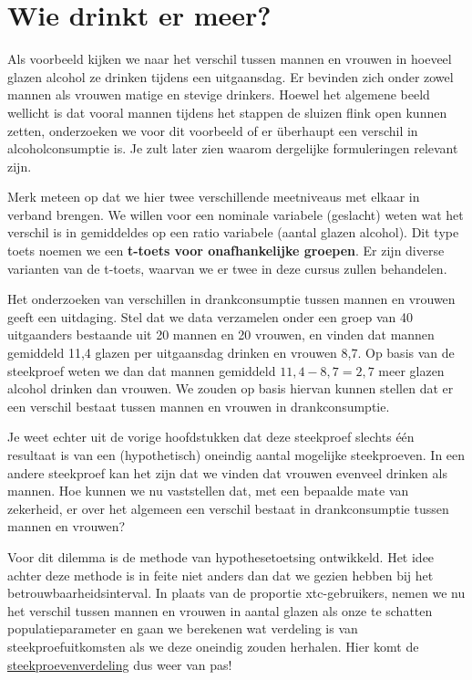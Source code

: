 \documentclass[
  letterpaper,
  DIV=11,
  numbers=noendperiod]{scrreprt}
\begin{document}
\section{Wie drinkt er meer?}\label{wie-drinkt-er-meer}

Als voorbeeld kijken we naar het verschil tussen mannen en vrouwen in
hoeveel glazen alcohol ze drinken tijdens een uitgaansdag. Er bevinden
zich onder zowel mannen als vrouwen matige en stevige drinkers. Hoewel
het algemene beeld wellicht is dat vooral mannen tijdens het stappen de
sluizen flink open kunnen zetten, onderzoeken we voor dit voorbeeld of
er überhaupt een verschil in alcoholconsumptie is. Je zult later zien
waarom dergelijke formuleringen relevant zijn.

Merk meteen op dat we hier twee verschillende meetniveaus met elkaar in
verband brengen. We willen voor een nominale variabele (geslacht) weten
wat het verschil is in gemiddeldes op een ratio variabele (aantal glazen
alcohol). Dit type toets noemen we een \textbf{t-toets voor
onafhankelijke groepen}. Er zijn diverse varianten van de t-toets,
waarvan we er twee in deze cursus zullen behandelen.

Het onderzoeken van verschillen in drankconsumptie tussen mannen en
vrouwen geeft een uitdaging. Stel dat we data verzamelen onder een groep
van 40 uitgaanders bestaande uit 20 mannen en 20 vrouwen, en vinden dat
mannen gemiddeld 11,4 glazen per uitgaansdag drinken en vrouwen 8,7. Op
basis van de steekproef weten we dan dat mannen gemiddeld
\(11,4-8,7=2,7\) meer glazen alcohol drinken dan vrouwen. We zouden op
basis hiervan kunnen stellen dat er een verschil bestaat tussen mannen
en vrouwen in drankconsumptie.

Je weet echter uit de vorige hoofdstukken dat deze steekproef slechts
één resultaat is van een (hypothetisch) oneindig aantal mogelijke
steekproeven. In een andere steekproef kan het zijn dat we vinden dat
vrouwen evenveel drinken als mannen. Hoe kunnen we nu vaststellen dat,
met een bepaalde mate van zekerheid, er over het algemeen een verschil
bestaat in drankconsumptie tussen mannen en vrouwen?

Voor dit dilemma is de methode van hypothesetoetsing ontwikkeld. Het
idee achter deze methode is in feite niet anders dan dat we gezien
hebben bij het betrouwbaarheidsinterval. In plaats van de proportie
xtc-gebruikers, nemen we nu het verschil tussen mannen en vrouwen in
aantal glazen als onze te schatten populatieparameter en gaan we
berekenen wat verdeling is van steekproefuitkomsten als we deze oneindig
zouden herhalen. Hier komt de
\hyperref[sec-steekproefcentraallimiet]{steekproevenverdeling} dus weer
van pas!
\end{document}
